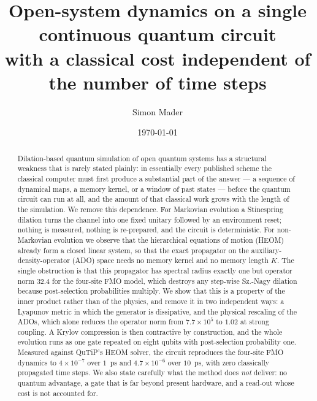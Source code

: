 \documentclass[aps,prx,twocolumn,superscriptaddress,nofootinbib,longbibliography]{revtex4-2}
\theoremstyle{plain}
\begin{document}
\title{Open-system dynamics on a single continuous quantum circuit\\
       with a classical cost independent of the number of time steps}

\author{Simon Mader}

\date{\today}

\begin{abstract}
Dilation-based quantum simulation of open quantum systems has a structural
weakness that is rarely stated plainly: in essentially every published scheme
the classical computer must first produce a substantial part of the answer ---
a sequence of dynamical maps, a memory kernel, or a window of past states ---
before the quantum circuit can run at all, and the amount of that classical work
grows with the length of the simulation.  We remove this dependence.  For
Markovian evolution a Stinespring dilation turns the channel into one fixed
unitary followed by an environment reset; nothing is measured, nothing is
re-prepared, and the circuit is deterministic.  For non-Markovian evolution we
observe that the hierarchical equations of motion (HEOM) already form a closed
linear system, so that the exact propagator on the auxiliary-density-operator
(ADO) space needs no memory kernel and no memory length $K$.  The single
obstruction is that this propagator has spectral radius exactly one but operator
norm $32.4$ for the four-site FMO model, which destroys any step-wise Sz.-Nagy
dilation because post-selection probabilities multiply.  We show that this is a
property of the inner product rather than of the physics, and remove it in two
independent ways: a Lyapunov metric in which the generator is dissipative, and
the physical rescaling of the ADOs, which alone reduces the operator norm from
$7.7\times10^{5}$ to $1.02$ at strong coupling.  A Krylov compression is then
contractive by construction, and the whole evolution runs as one gate repeated
on eight qubits with post-selection probability one.  Measured against QuTiP's
HEOM solver, the circuit reproduces the four-site FMO dynamics to
$4\times10^{-7}$ over $1$~ps and $4.7\times10^{-6}$ over $10$~ps, with zero
classically propagated time steps.  We also state carefully what the method does
\emph{not} deliver: no quantum advantage, a gate that is far beyond present
hardware, and a read-out whose cost is not accounted for.
\end{abstract}

\maketitle
\end{document}
